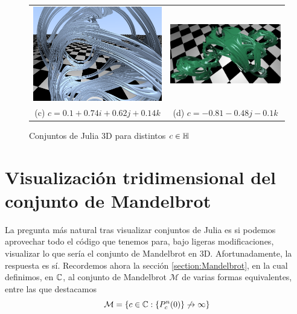 \begin{figure}[ht]
\begin{tabular}{cc}
    \includegraphics[scale=0.21]{img/C8/julia-3.png} &     \includegraphics[scale=0.25]{img/C8/julia-4.png} \\
    (c) $c=0.1+0.74i+0.62j+0.14k$ & (d) $c=-0.81-0.48j-0.1k$ \\[6pt]
    \end{tabular}
    \caption{Conjuntos de Julia 3D para distintos $c\in\mathbb{H}$}
    \label{fig:julia-3D}
\end{figure}

\section{Visualización tridimensional del conjunto de Mandelbrot}
\label{section:Mandelbrot-3D}

La pregunta más natural tras visualizar conjuntos de Julia es si podemos aprovechar todo el código que tenemos para, bajo ligeras modificaciones, visualizar lo que sería el conjunto de Mandelbrot en 3D. Afortunadamente, la respuesta es sí. Recordemos ahora la sección \ref{section:Mandelbrot}, en la cual definimos, en $\mathbb{C}$, al conjunto de Mandelbrot $\mathcal{M}$ de varias formas equivalentes, entre las que destacamos
$$
\mathcal{M}=\{c\in\mathbb{C} : \{P_c^n(0)\}\not\rightarrow\infty\}
$$

